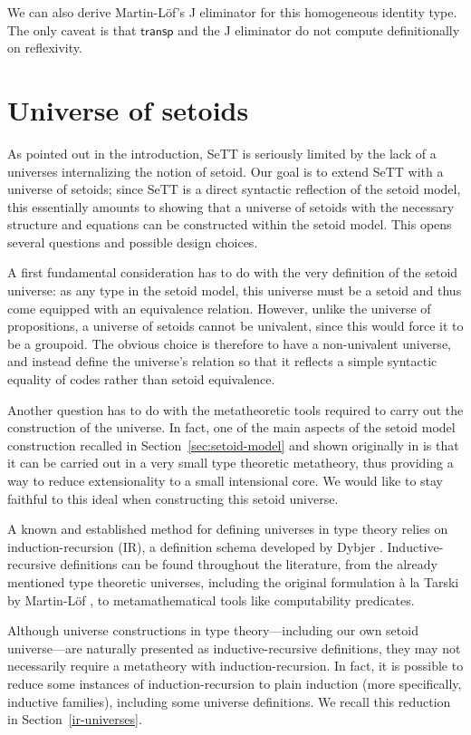 \documentclass[a4paper,UKenglish,cleveref, autoref, thm-restate]{lipics-v2019}
\begin{document}
We can also derive Martin-L\"of's J eliminator for this homogeneous identity
type. The only caveat is that $\textsf{transp}$ and the J eliminator do not
compute definitionally on reflexivity.

\section{Universe of setoids}\label{setoid-universe}

As pointed out in the introduction, SeTT is seriously limited by the lack of a
universes internalizing the notion of setoid. Our goal is to extend SeTT with a
universe of setoids; since SeTT is a direct syntactic reflection of the setoid
model, this essentially amounts to showing that a universe of setoids with the
necessary structure and equations can be constructed within the setoid
model. This opens several questions and possible design choices.

A first fundamental consideration has to do with the very definition of the setoid
universe: as any type in the setoid model, this universe must be a setoid and
thus come equipped with an equivalence relation. However, unlike the universe of
propositions, a universe of setoids cannot be univalent, since this would force
it to be a groupoid. The obvious choice is therefore to have a non-univalent
universe, and instead define the universe's relation so that it reflects a
simple syntactic equality of codes rather than setoid equivalence.

Another question has to do with the metatheoretic tools required to carry out
the construction of the universe. In fact, one of the main aspects of the setoid
model construction recalled in Section~\ref{sec:setoid-model} and shown originally
in \cite{setoid99} is that it can be carried out in a very small type theoretic
metatheory, thus providing a way to reduce extensionality to a small intensional
core.
%
We would like to stay faithful to this ideal when constructing this setoid
universe.

A known and established method for defining universes in type theory relies on
induction-recursion (IR), a definition schema developed by Dybjer
\cite{ir-dybjer, dybjer-setzer}. Inductive-recursive definitions can be found
throughout the literature, from the already mentioned type theoretic universes,
including the original formulation \`{a} la Tarski by Martin-L\"of
\cite{libretto}, to metamathematical tools like computability predicates.

Although universe constructions in type theory---including our own setoid
universe---are naturally presented as inductive-recursive definitions, they may
not necessarily require a metatheory with induction-recursion. In fact, it is
possible to reduce some instances of induction-recursion to plain induction
(more specifically, inductive families), including some universe definitions. We
recall this reduction in Section~\ref{ir-universes}.
\end{document}
